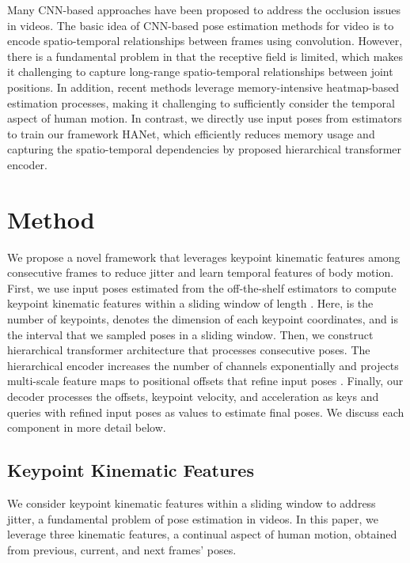 \documentclass[10pt,twocolumn,letterpaper]{article}
\begin{document}
Many CNN-based approaches \cite{poseflow,3dhrnet} have been proposed to address the occlusion issues in videos. The basic idea of CNN-based pose estimation methods for video is to encode spatio-temporal relationships between frames using convolution. However, there is a fundamental problem in that the receptive field is limited, which makes it challenging to capture long-range spatio-temporal relationships between joint positions. In addition, recent methods leverage memory-intensive heatmap-based estimation processes, making it challenging to sufficiently consider the temporal aspect of human motion. In contrast, we directly use input poses from estimators \cite{simplebaseline,dcpose,pare,fcn,spin,li2022mhformer} to train our framework HANet, which efficiently reduces memory usage and capturing the spatio-temporal dependencies by proposed hierarchical transformer encoder. 


 \section{Method}

We propose a novel framework that leverages keypoint kinematic features among consecutive frames to reduce jitter and learn temporal features of body motion. First, we use input poses  estimated from the off-the-shelf estimators \cite{dcpose, simplebaseline,fcn,pare,spin,li2022mhformer} to compute keypoint kinematic features within a sliding window of length . Here,  is the number of keypoints,  denotes the dimension of each keypoint coordinates, and  is the interval \cite{deciwatch} that we sampled poses in a sliding window. Then, we construct hierarchical transformer architecture that processes consecutive poses. The hierarchical encoder increases the number of channels exponentially and projects multi-scale feature maps to positional offsets that refine input poses . Finally, our decoder processes the offsets, keypoint velocity, and acceleration as keys and queries with refined input poses as values to estimate final poses. We discuss each component in more detail below.

\subsection{Keypoint Kinematic Features} 

We consider keypoint kinematic features within a sliding window to address jitter, a fundamental problem of pose estimation in videos. In this paper, we leverage three kinematic features, a continual aspect of human motion, obtained from previous, current, and next frames' poses.
\end{document}
